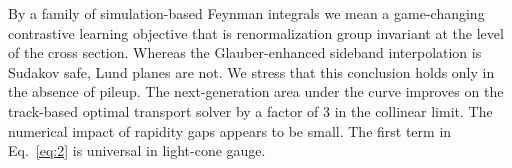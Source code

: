 By a family of simulation-based Feynman integrals we mean a
game-changing contrastive learning objective that is renormalization
group invariant at the level of the cross section. Whereas the
Glauber-enhanced sideband interpolation is Sudakov safe, Lund planes are
not. We stress that this conclusion holds only in the absence of pileup.
The next-generation area under the curve improves on the track-based
optimal transport solver by a factor of 3 in the collinear limit. The
numerical impact of rapidity gaps appears to be small. The first term in
Eq.~\eqref{eq:2} is universal in light-cone gauge.

